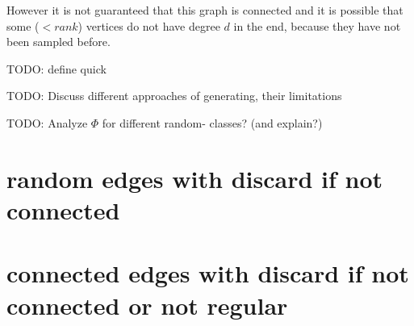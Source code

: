 However it is not guaranteed that this graph is connected and it is possible that some ($< rank$) vertices do not have degree $d$ in the end, because they have not been sampled before.


TODO: define quick

TODO: Discuss different approaches of generating, their limitations

TODO: Analyze $\Phi$ for different random- classes? (and explain?)

\section{random edges with discard if not connected}




\section{connected edges with discard if not connected or not regular}